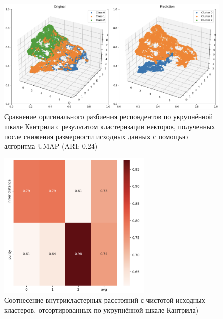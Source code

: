 \begin{figure}
	\begin{center}
		\includegraphics[width=\textwidth]{images/17.png}
	\end{center}
	\caption{Сравнение оригинального разбиения респондентов по укрупнённой шкале Кантрила с результатом кластеризации векторов, полученных после снижения размерности исходных данных с помощью алгоритма UMAP (ARI: 0.24)}
	\label{img:14}
\end{figure}

\begin{figure}
	\begin{center}
		\includegraphics[width=0.65\textwidth]{images/18.png}
	\end{center}
	\caption{Соотнесение внутрикластерных расстояний с чистотой исходных кластеров, отсортированных по укрупнённой шкале Кантрила)}
	\label{img:15}
\end{figure}

\FloatBarrier
